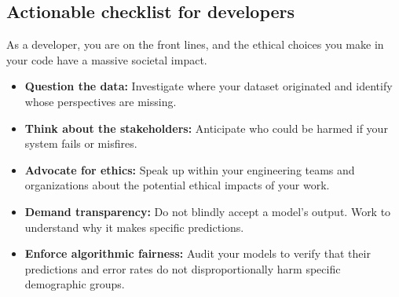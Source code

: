 \documentclass[11pt]{article}
\begin{document}
\subsection{Actionable checklist for developers}
As a developer, you are on the front lines, and the ethical choices you make in your code have a massive societal impact.
\begin{itemize}
    \item \textbf{Question the data:} Investigate where your dataset originated and identify whose perspectives are missing.
    \item \textbf{Think about the stakeholders:} Anticipate who could be harmed if your system fails or misfires.
    \item \textbf{Advocate for ethics:} Speak up within your engineering teams and organizations about the potential ethical impacts of your work.
    \item \textbf{Demand transparency:} Do not blindly accept a model's output. Work to understand why it makes specific predictions.
    \item \textbf{Enforce algorithmic fairness:} Audit your models to verify that their predictions and error rates do not disproportionally harm specific demographic groups.
\end{itemize}
\end{document}

